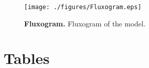 \documentclass[10pt]{article}
\begin{document}
\begin{figure}[!ht]
\begin{center}
\texttt{[image: ./figures/Fluxogram.eps]}
\end{center}
\caption{
{\bf Fluxogram.} Fluxogram of the model.
}
\label{fig:Fluxogram}
\end{figure}


\vspace{1cm}
\section*{Tables}
\end{document}
